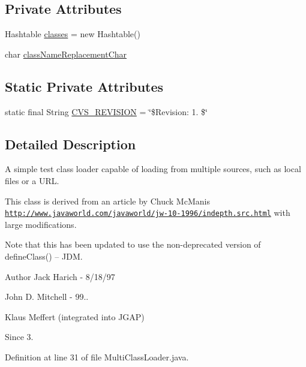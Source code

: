 \subsection*{Private Attributes}
\begin{DoxyCompactItemize}
\item 
Hashtable \hyperlink{classorg_1_1jgap_1_1util_1_1_multi_class_loader_a9bf208aab68f40238eaa34493dd8c6ee}{classes} = new Hashtable()
\item 
char \hyperlink{classorg_1_1jgap_1_1util_1_1_multi_class_loader_a0e255f36a9c6dd5fa577f5bbd1869a94}{class\-Name\-Replacement\-Char}
\end{DoxyCompactItemize}
\subsection*{Static Private Attributes}
\begin{DoxyCompactItemize}
\item 
static final String \hyperlink{classorg_1_1jgap_1_1util_1_1_multi_class_loader_a4de9db8aab4e1d0d25363cf3dd635773}{C\-V\-S\-\_\-\-R\-E\-V\-I\-S\-I\-O\-N} = \char`\"{}\$Revision\-: 1. \$\char`\"{}
\end{DoxyCompactItemize}


\subsection{Detailed Description}
A simple test class loader capable of loading from multiple sources, such as local files or a U\-R\-L.

This class is derived from an article by Chuck Mc\-Manis \href{http://www.javaworld.com/javaworld/jw-10-1996/indepth.src.html}{\tt http\-://www.\-javaworld.\-com/javaworld/jw-\/10-\/1996/indepth.\-src.\-html} with large modifications.

Note that this has been updated to use the non-\/deprecated version of define\-Class() -- J\-D\-M.

\begin{DoxyAuthor}{Author}
Jack Harich -\/ 8/18/97 

John D. Mitchell -\/ 99.. 

Klaus Meffert (integrated into J\-G\-A\-P)
\end{DoxyAuthor}
\begin{DoxySince}{Since}
3. 
\end{DoxySince}


Definition at line 31 of file Multi\-Class\-Loader.\-java.



